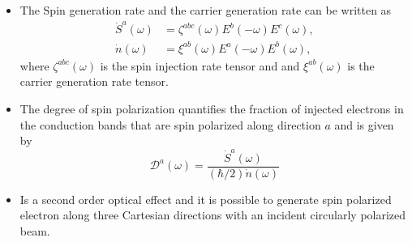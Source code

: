 \documentclass{beamer}
\begin{document}
\begin{frame}


{\small

\begin{itemize}

\item 
The Spin generation rate and the carrier generation rate can be written as
\vspace{-4mm}
\begin{align*}
    \dot{S}^{a}(\omega)&= 
\zeta^{abc}(\omega)E^{b}(-\omega)E^{c}(\omega), \\
\dot{n}(\omega)&= 
\xi^{ab}(\omega)E^{a}(-\omega)E^{b}(\omega),
\end{align*}
where $\zeta^{abc}(\omega)$ is the spin injection rate tensor and and $\xi^
{ab}(\omega)$ is the carrier generation rate tensor.

\item 
The degree of spin polarization quantifies the fraction of injected electrons
in the conduction bands that are spin polarized along direction $a$ and is
given by
\vspace{-2mm}
\begin{equation}
\mathcal{D}^{a}(\omega)=
\frac{\dot{S}^{a}(\omega)}{(\hbar/2)\dot{n}(\omega)}
\end{equation}

\item 
Is a second order optical effect and it is possible to generate spin polarized
electron along three Cartesian directions with an incident circularly polarized
beam.


\end{itemize}
}


\end{frame}



\end{document}
